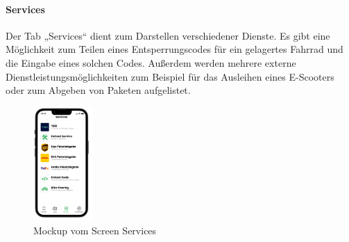 \paragraph{Services}Der Tab „Services“ dient zum Darstellen verschiedener Dienste. Es gibt eine Möglichkeit zum Teilen eines Entsperrungscodes für ein gelagertes Fahrrad und die Eingabe eines solchen Codes. Außerdem werden mehrere externe Dienstleistungsmöglichkeiten zum Beispiel für das Ausleihen eines E-Scooters oder zum Abgeben von Paketen aufgelistet.\\
\begin{figure}[H]
  \centering
  \includegraphics[width=0.2\textwidth]{images/app_mock_services}
  \caption{Mockup vom Screen Services}
  \label{fig:screenservices}
\end{figure}

